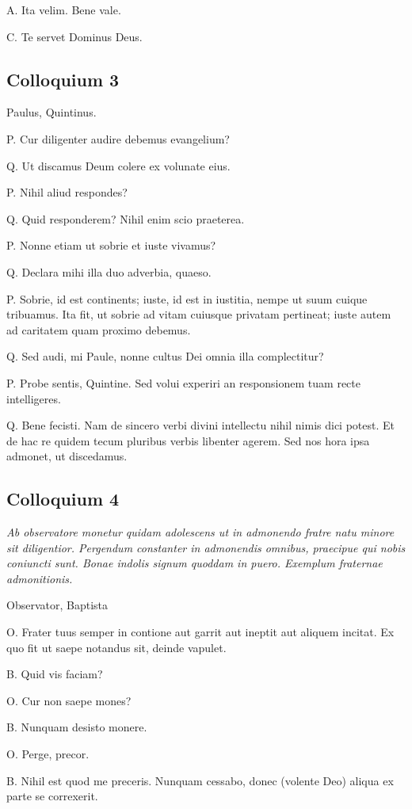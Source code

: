 \documentclass{article}
\begin{document}
A. Ita velim. Bene vale.

C. Te servet Dominus Deus.

\subsection{Colloquium 3}
Paulus, Quintinus.

P. Cur diligenter audire debemus evangelium?

Q. Ut discamus Deum colere ex volunate eius.

P. Nihil aliud respondes?

Q. Quid responderem? Nihil enim scio praeterea.

P. Nonne etiam ut sobrie et iuste vivamus?

Q. Declara mihi illa duo adverbia, quaeso.

P. Sobrie, id est continents; iuste, id est in iustitia, nempe ut suum cuique tribuamus. Ita fit, ut sobrie ad vitam cuiusque privatam pertineat; iuste autem ad caritatem quam proximo debemus.

Q. Sed audi, mi Paule, nonne cultus Dei omnia illa complectitur?

P. Probe sentis, Quintine. Sed volui experiri an responsionem tuam recte intelligeres.

Q. Bene fecisti. Nam de sincero verbi divini intellectu nihil nimis dici potest. Et de hac re quidem tecum pluribus verbis libenter agerem. Sed nos hora ipsa admonet, ut discedamus.

\subsection{Colloquium 4}
\emph{Ab observatore monetur quidam adolescens ut in admonendo fratre natu minore sit diligentior. Pergendum constanter in admonendis omnibus, praecipue qui nobis coniuncti sunt. Bonae indolis signum quoddam in puero. Exemplum fraternae admonitionis.}

Observator, Baptista

O. Frater tuus semper in contione aut garrit aut ineptit aut aliquem incitat. Ex quo fit ut saepe notandus sit, deinde vapulet.

B. Quid vis faciam?

O. Cur non saepe mones?

B. Nunquam desisto monere.

O. Perge, precor.

B. Nihil est quod me preceris. Nunquam cessabo, donec (volente Deo) aliqua ex parte se correxerit.
\end{document}
